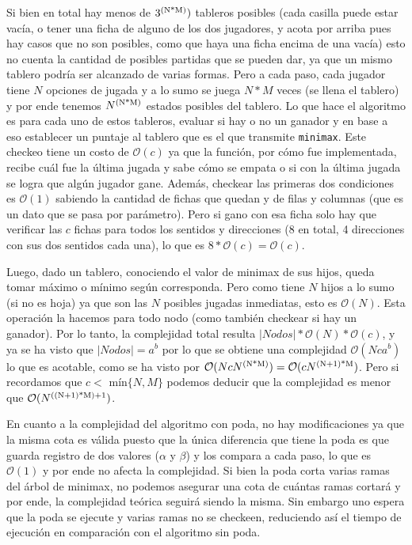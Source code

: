 \documentclass[A4paper,oneside,fleqn,11pt]{article}
\theoremstyle{definition}
\begin{document}
Si bien en total hay menos de $3\textsuperscript{(N*M)})$ tableros posibles (cada casilla puede estar vacía, o tener una ficha de alguno de los dos jugadores, y acota por arriba pues hay casos que no son posibles, como que haya una ficha encima de una vacía) esto no cuenta la cantidad de posibles partidas que se pueden dar, ya que un mismo tablero podría ser alcanzado de varias formas. Pero a cada paso, cada jugador tiene $N$ opciones de jugada y a lo sumo se juega $N*M$ veces (se llena el tablero) y por ende tenemos $N\textsuperscript{(N*M)}$ estados posibles del tablero. Lo que hace el algoritmo es para cada uno de estos tableros, evaluar si hay o no un ganador y en base a eso establecer un puntaje al tablero que es el que transmite \texttt{minimax}. Este checkeo tiene un costo de $\mathcal{O}(c)$ ya que la función, por cómo fue implementada, recibe cuál fue la última jugada y sabe cómo se empata o si con la última jugada se logra que algún jugador gane. Además, checkear las primeras dos condiciones es $\mathcal{O}(1)$ sabiendo la cantidad de fichas que quedan y de filas y columnas (que es un dato que se pasa por parámetro). Pero si gano con esa ficha solo hay que verificar las $c$ fichas para todos los sentidos y direcciones (8 en total, 4 direcciones con sus dos sentidos cada una), lo que es $8* \mathcal{O}(c)= \mathcal{O}(c)$. 

Luego, dado un tablero, conociendo el valor de minimax de sus hijos, queda tomar máximo o mínimo según corresponda. Pero como tiene $N$ hijos a lo sumo (si no es hoja) ya que son las $N$ posibles jugadas inmediatas, esto es $\mathcal{O}(N)$. Esta operación la hacemos para todo nodo (como también checkear si hay un ganador). Por lo tanto, la complejidad total resulta $|Nodos|*\mathcal{O}(N)*\mathcal{O}(c)$, y ya se ha visto que $|Nodos|=a^b$ por lo que se obtiene una complejidad $\mathcal{O}(N c a^b)$ lo que es acotable, como se ha visto por $\mathcal{O}(N c N\textsuperscript{(N*M)})=\mathcal{O}(c N\textsuperscript{(N+1)*M})$. Pero si recordamos que $c<$ mín$\{N,M\}$ podemos deducir que la complejidad es menor que $\mathcal{O}(N\textsuperscript{((N+1)*M)+1})$.

En cuanto a la complejidad del algoritmo con poda, no hay modificaciones ya que la misma cota es válida puesto que la única diferencia que tiene la poda es que guarda registro de dos valores ($\alpha$ y $\beta$) y los compara a cada paso, lo que es $\mathcal{O}(1)$ y por ende no afecta la complejidad. Si bien la poda corta varias ramas del árbol de minimax, no podemos asegurar una cota de cuántas ramas cortará y por ende, la complejidad teórica seguirá siendo la misma. Sin embargo uno espera que la poda se ejecute y varias ramas no se checkeen, reduciendo así el tiempo de ejecución en comparación con el algoritmo sin poda.
\end{document}
